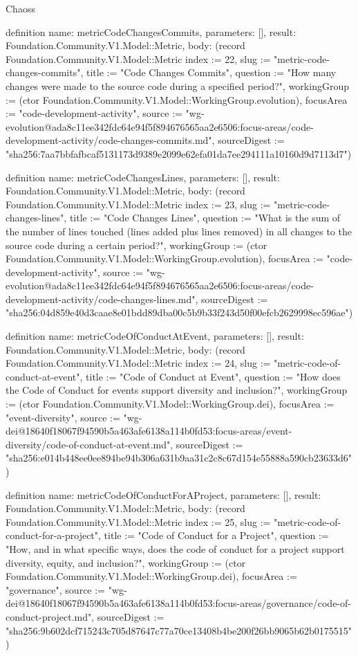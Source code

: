 \begin{lexlean}{Chaoss}
\begin{semanticmodule}
definition{
  name: metricCodeChangesCommits,
  parameters: [],
  result: Foundation.Community.V1.Model::Metric,
  body: (record Foundation.Community.V1.Model::Metric {index := 22, slug := "metric-code-changes-commits", title := "Code Changes Commits", question := "How many changes were made to the source code during a specified period?", workingGroup := (ctor Foundation.Community.V1.Model::WorkingGroup.evolution), focusArea := "code-development-activity", source := "wg-evolution@ada8c11ee342fdc64e94f5f894676565aa2e6506:focus-areas/code-development-activity/code-changes-commits.md", sourceDigest := "sha256:7aa7bbfafbcaf5131173d9389e2099e62efa01da7ee294111a10160d9d7113d7"})
}

definition{
  name: metricCodeChangesLines,
  parameters: [],
  result: Foundation.Community.V1.Model::Metric,
  body: (record Foundation.Community.V1.Model::Metric {index := 23, slug := "metric-code-changes-lines", title := "Code Changes Lines", question := "What is the sum of the number of lines touched (lines added plus lines removed) in all changes to the source code during a certain period?", workingGroup := (ctor Foundation.Community.V1.Model::WorkingGroup.evolution), focusArea := "code-development-activity", source := "wg-evolution@ada8c11ee342fdc64e94f5f894676565aa2e6506:focus-areas/code-development-activity/code-changes-lines.md", sourceDigest := "sha256:04d859e40d3caae8e01bdd89dba00c5b9b33f243d50f00efcb2629998ec596ae"})
}

definition{
  name: metricCodeOfConductAtEvent,
  parameters: [],
  result: Foundation.Community.V1.Model::Metric,
  body: (record Foundation.Community.V1.Model::Metric {index := 24, slug := "metric-code-of-conduct-at-event", title := "Code of Conduct at Event", question := "How does the Code of Conduct for events support diversity and inclusion?", workingGroup := (ctor Foundation.Community.V1.Model::WorkingGroup.dei), focusArea := "event-diversity", source := "wg-dei@18640f18067f94590b5a463afe6138a114b0fd53:focus-areas/event-diversity/code-of-conduct-at-event.md", sourceDigest := "sha256:e014b448ee0ee894be94b306a631b9aa31c2c8c67d154e55888a590cb23633d6"})
}

definition{
  name: metricCodeOfConductForAProject,
  parameters: [],
  result: Foundation.Community.V1.Model::Metric,
  body: (record Foundation.Community.V1.Model::Metric {index := 25, slug := "metric-code-of-conduct-for-a-project", title := "Code of Conduct for a Project", question := "How, and in what specific ways, does the code of conduct for a project support diversity, equity, and inclusion?", workingGroup := (ctor Foundation.Community.V1.Model::WorkingGroup.dei), focusArea := "governance", source := "wg-dei@18640f18067f94590b5a463afe6138a114b0fd53:focus-areas/governance/code-of-conduct-project.md", sourceDigest := "sha256:9b602dcf715243c705d87647c77a70ce13408b4be200f26bb9065b62b0175515"})
}


\end{semanticmodule}
\end{lexlean}
